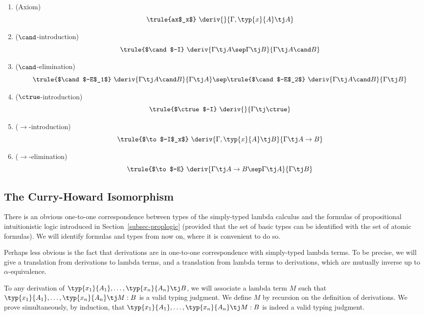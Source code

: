 \documentclass[12pt]{article}
\begin{document}
\begin{enumerate}
\item (Axiom)
\[ \trule{ax$_x$}\ \deriv{}{\Gamma,\typ{x}{A}\tj A}
\]
\item ($\cand$-introduction)
\[ \trule{$\cand$-I}\ \deriv{\Gamma\tj A\sep\Gamma\tj B}{\Gamma\tj A\cand B}
\]
\item ($\cand$-elimination)
\[ \trule{$\cand$-E$_1$}\ \deriv{\Gamma\tj A\cand B}{\Gamma\tj A}
\sep
\trule{$\cand$-E$_2$}\ \deriv{\Gamma\tj A\cand B}{\Gamma\tj B}
\]
\item ($\ctrue$-introduction)
\[ \trule{$\ctrue$-I}\ \deriv{}{\Gamma\tj\ctrue}
\]
\item ($\to$-introduction)
\[ \trule{$\to$-I$_x$}\ \deriv{\Gamma,\typ{x}{A}\tj B}{\Gamma\tj A\to B}
\]
\item ($\to$-elimination)
\[ \trule{$\to$-E}\ \deriv{\Gamma\tj A\to B\sep \Gamma\tj A}{\Gamma\tj B}
\]
\suspendenumerate
\end{enumerate}

\subsection{The Curry-Howard Isomorphism}

There is an obvious one-to-one correspondence between types of the
simply-typed lambda calculus and the formulas of propositional
intuitionistic logic introduced in Section~\ref{subsec-proplogic}
(provided that the set of basic types can be identified with the set
of atomic formulas). We will identify formulas and types from now on,
where it is convenient to do so.

Perhaps less obvious is the fact that derivations are in one-to-one
correspondence with simply-typed lambda terms. To be precise, we
will give a translation from derivations to lambda terms, and a
translation from lambda terms to derivations, which are mutually
inverse up to $\alpha$-equivalence. 

To any derivation of $\typ{x_1}{A_1},\ldots,\typ{x_n}{A_n}\tj B$, we
will associate a lambda term $M$ such that
$\typ{x_1}{A_1},\ldots,\typ{x_n}{A_n}\tj M:B$ is a valid typing
judgment. We define $M$ by recursion on the definition of derivations.
We prove simultaneously, by induction, that
$\typ{x_1}{A_1},\ldots,\typ{x_n}{A_n}\tj M:B$ is indeed a valid typing
judgment.
\end{document}
